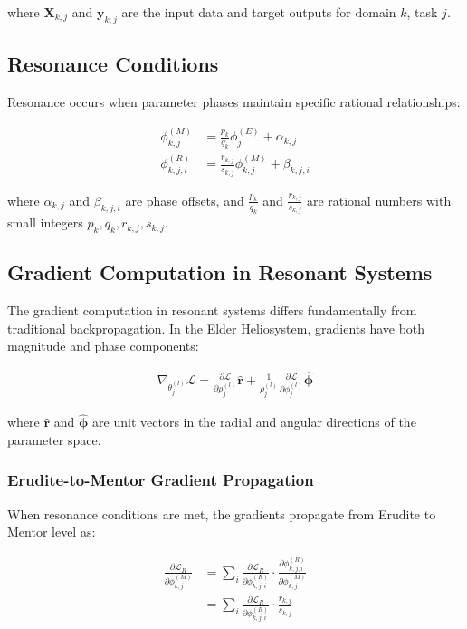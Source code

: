 where $\mathbf{X}_{k,j}$ and $\mathbf{y}_{k,j}$ are the input data and target outputs for domain $k$, task $j$.

\subsection{Resonance Conditions}

Resonance occurs when parameter phases maintain specific rational relationships:

\begin{align}
\phi^{(M)}_{k,j} &= \frac{p_k}{q_k}\phi^{(E)}_{j} + \alpha_{k,j} \\
\phi^{(R)}_{k,j,i} &= \frac{r_{k,j}}{s_{k,j}}\phi^{(M)}_{k,j} + \beta_{k,j,i}
\end{align}

where $\alpha_{k,j}$ and $\beta_{k,j,i}$ are phase offsets, and $\frac{p_k}{q_k}$ and $\frac{r_{k,j}}{s_{k,j}}$ are rational numbers with small integers $p_k, q_k, r_{k,j}, s_{k,j}$.

\subsection{Gradient Computation in Resonant Systems}

The gradient computation in resonant systems differs fundamentally from traditional backpropagation. In the Elder Heliosystem, gradients have both magnitude and phase components:

\begin{align}
\nabla_{\theta^{(l)}_j} \mathcal{L} = \frac{\partial \mathcal{L}}{\partial \rho^{(l)}_j}\hat{\mathbf{r}} + \frac{1}{\rho^{(l)}_j}\frac{\partial \mathcal{L}}{\partial \phi^{(l)}_j}\hat{\boldsymbol{\phi}}
\end{align}

where $\hat{\mathbf{r}}$ and $\hat{\boldsymbol{\phi}}$ are unit vectors in the radial and angular directions of the parameter space.

\subsubsection{Erudite-to-Mentor Gradient Propagation}

When resonance conditions are met, the gradients propagate from Erudite to Mentor level as:

\begin{align}
\frac{\partial \mathcal{L}_R}{\partial \phi^{(M)}_{k,j}} &= \sum_i \frac{\partial \mathcal{L}_R}{\partial \phi^{(R)}_{k,j,i}} \cdot \frac{\partial \phi^{(R)}_{k,j,i}}{\partial \phi^{(M)}_{k,j}} \\
&= \sum_i \frac{\partial \mathcal{L}_R}{\partial \phi^{(R)}_{k,j,i}} \cdot \frac{r_{k,j}}{s_{k,j}}
\end{align}

